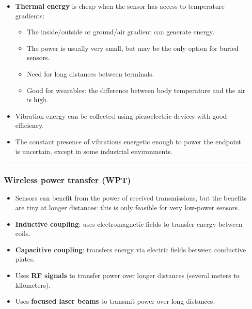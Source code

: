 \documentclass[
]{article}
\providecommand{\tightlist}{%
  \setlength{\itemsep}{0pt}\setlength{\parskip}{0pt}}
\begin{document}
\begin{itemize}
\tightlist
\item
  \textbf{Thermal energy} is cheap when the sensor has access to
  temperature gradients:

  \begin{itemize}
  \tightlist
  \item
    The inside/outside or ground/air gradient can generate energy.
  \item
    The power is usually very small, but may be the only option for
    buried sensors.
  \item
    Need for long distances between terminals.
  \item
    Good for wearables: the difference between body temperature and the
    air is high.
  \end{itemize}
\item
  Vibration energy can be collected using piezoelectric devices with
  good efficiency.
\item
  The constant presence of vibrations energetic enough to power the
  endpoint is uncertain, except in some industrial environments.
\end{itemize}

\begin{center}\rule{0.5\linewidth}{0.5pt}\end{center}

\subsubsection{Wireless power transfer
(WPT)}\label{wireless-power-transfer-wpt}

\begin{itemize}
\tightlist
\item
  Sensors can benefit from the power of received transmissions, but the
  benefits are tiny at longer distances: this is only feasible for very
  low-power sensors.
\item
  \textbf{Inductive coupling}: uses electromagnetic fields to transfer
  energy between coils.
\item
  \textbf{Capacitive coupling}: transfers energy via electric fields
  between conductive plates.
\item
  Uses \textbf{RF signals} to transfer power over longer distances
  (several meters to kilometers).
\item
  Uses \textbf{focused laser beams} to transmit power over long
  distances.
\end{itemize}
\end{document}
